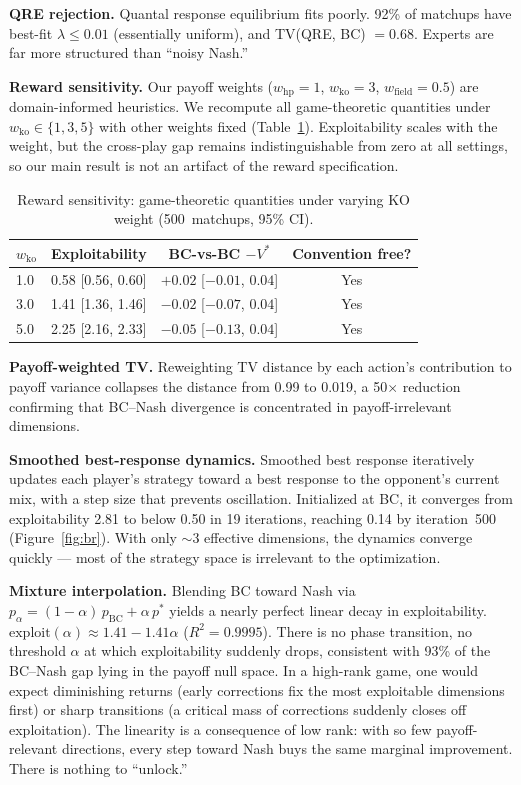\documentclass{article}
\begin{document}
\textbf{QRE rejection.} Quantal response equilibrium \citep{mckelvey1995quantal} fits poorly. 92\% of matchups have best-fit $\lambda \leq 0.01$ (essentially uniform), and TV(QRE, BC) $= 0.68$. Experts are far more structured than ``noisy Nash.''

\textbf{Reward sensitivity.} Our payoff weights ($w_\text{hp} = 1$, $w_\text{ko} = 3$, $w_\text{field} = 0.5$) are domain-informed heuristics. We recompute all game-theoretic quantities under $w_\text{ko} \in \{1, 3, 5\}$ with other weights fixed (Table~\ref{tab:reward_sens}). Exploitability scales with the weight, but the cross-play gap remains indistinguishable from zero at all settings, so our main result is not an artifact of the reward specification.

\begin{table}[t]
\caption{Reward sensitivity: game-theoretic quantities under varying KO weight (500~matchups, 95\% CI).}
\label{tab:reward_sens}
\vskip 0.1in
\centering
\small
\begin{tabular}{lccc}
\toprule
$w_\text{ko}$ & Exploitability & BC-vs-BC $- V^*$ & Convention free? \\
\midrule
1.0 & 0.58 [0.56, 0.60] & $+0.02$ [$-0.01$, $0.04$] & Yes \\
3.0 & 1.41 [1.36, 1.46] & $-0.02$ [$-0.07$, $0.04$] & Yes \\
5.0 & 2.25 [2.16, 2.33] & $-0.05$ [$-0.13$, $0.04$] & Yes \\
\bottomrule
\end{tabular}
\vskip -0.1in
\end{table}

\textbf{Payoff-weighted TV.} Reweighting TV distance by each action's contribution to payoff variance collapses the distance from 0.99 to 0.019, a 50$\times$ reduction confirming that BC--Nash divergence is concentrated in payoff-irrelevant dimensions.

\textbf{Smoothed best-response dynamics.} Smoothed best response iteratively updates each player's strategy toward a best response to the opponent's current mix, with a step size that prevents oscillation. Initialized at BC, it converges from exploitability 2.81 to below 0.50 in 19 iterations, reaching 0.14 by iteration~500 (Figure~\ref{fig:br}). With only ${\sim}3$ effective dimensions, the dynamics converge quickly --- most of the strategy space is irrelevant to the optimization.

\textbf{Mixture interpolation.} Blending BC toward Nash via $p_\alpha = (1{-}\alpha)\,p_\text{BC} + \alpha\,p^*$ yields a nearly perfect linear decay in exploitability. $\text{exploit}(\alpha) \approx 1.41 - 1.41\alpha$ ($R^2 = 0.9995$). There is no phase transition, no threshold $\alpha$ at which exploitability suddenly drops, consistent with 93\% of the BC--Nash gap lying in the payoff null space. In a high-rank game, one would expect diminishing returns (early corrections fix the most exploitable dimensions first) or sharp transitions (a critical mass of corrections suddenly closes off exploitation). The linearity is a consequence of low rank: with so few payoff-relevant directions, every step toward Nash buys the same marginal improvement. There is nothing to ``unlock.''
\end{document}

